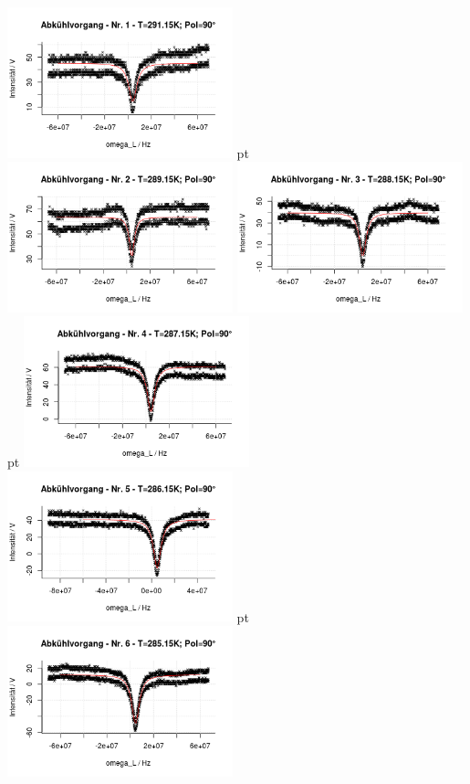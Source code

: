 \documentclass[12pt]{article}
\begin{document}
\begin{minipage}[h!]{\textwidth}
	\centering
	\includegraphics[width=0.49\textwidth]{figures/cold90-1.png} pt
	\includegraphics[width=0.49\textwidth]{figures/cold90-2.png}\vskip -10pt
	\includegraphics[width=0.49\textwidth]{figures/cold90-3.png} pt
	\includegraphics[width=0.49\textwidth]{figures/cold90-4.png}\vskip -10pt
	\includegraphics[width=0.49\textwidth]{figures/cold90-5.png} pt
	\includegraphics[width=0.49\textwidth]{figures/cold90-6.png}\vskip -10pt
\end{minipage}\newpage
\end{document}
